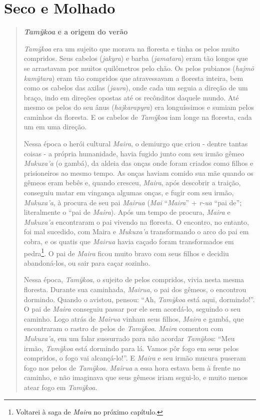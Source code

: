 \section{Seco e Molhado}\label{seco-e-molhado}

\begin{quote}
\textbf{\emph{Tamỹkoa} e a origem do verão}

\emph{Tamỹkoa} era um sujeito que morava na floresta e tinha os pelos
muito compridos. Seus cabelos (\emph{jakyra}) e barba (\emph{jamatara})
eram tão longos que se arrastavam por muitos quilômetros pelo chão. Os
pelos pubianos (\emph{hajmõ} \emph{kamỹtara}) eram tão compridos que
atravessavam a floresta inteira, bem como os cabelos das axilas
(\emph{jaura}), onde cada um seguia a direção de um braço, indo em
direções opostas até os recônditos daquele mundo. Até mesmo os pelos do
seu ânus (\emph{hajkarapyra}) era longuíssimos e sumiam pelos caminhos
da floresta. E os cabelos de \emph{Tamỹkoa} iam longe na floresta, cada
um em uma direção.

Nessa época o herói cultural \emph{Maira}, o demiurgo que criou - dentre
tantas coisas - a própria humanidade, havia fugido junto com seu irmão
gêmeo \emph{Mukuxa'a} (o gambá), da aldeia das onças onde foram criados
como filhos e prisioneiros ao mesmo tempo. As onças haviam comido sua
mãe quando os gêmeos eram bebês e, quando cresceu, \emph{Maira}, após
descobrir a traição, conseguiu matar em vingança algumas onças, e fugir
com seu irmão, \emph{Mukuxa'a}, à procura de seu pai \emph{Mairua}
(\emph{Mai} ``\emph{Maira}'' + \emph{r-ua} ``pai de''; literalmente o
``pai de \emph{Maira}). Após um tempo de procura, \emph{Maira} e
\emph{Mukuxa'a} encontraram o pai vivendo na floresta. O encontro, no
entanto, foi mal sucedido, com Maira e \emph{Mukuxa'a} transformando o
arco do pai em cobra, e os quatis que \emph{Mairua} havia caçado foram
transformados em pedra\footnote{Voltarei à saga de \emph{Maira} no
  próximo capítulo.}. O pai de \emph{Maira} ficou muito bravo com seus
filhos e decidiu abandoná-los, ou sair para caçar sozinho.

Nessa época, \emph{Tamỹkoa}, o sujeito de pelos compridos, vivia nesta
mesma floresta. Durante sua caminhada, \emph{Mairua}, o pai dos gêmeos,
o encontrou dormindo. Quando o avistou, pensou: ``Ah, \emph{Tamỹkoa}
está aqui, dormindo!''. O pai de \emph{Maira} conseguiu passar por ele
sem acordá-lo, seguindo o seu caminho. Logo atrás de \emph{Mairua}
vinham seus filhos, \emph{Maira} e gambá, que encontraram o rastro de
pelos de \emph{Tamỹkoa}. \emph{Maira} comentou com \emph{Mukuxa'a}, em
um falar sussurrado para não acordar \emph{Tamỹkoa}: ``Meu irmão,
\emph{Tamỹkoa} está dormindo para lá. Vamos pôr fogo em seus pelos
compridos, o fogo vai alcançá-lo!''. E \emph{Maira} e seu irmão mucura
puseram fogo nos pelos de \emph{Tamỹkoa}. \emph{Mairua} a essa hora
estava bem à frente no caminho, e não imaginava que seus gêmeos iriam
segui-lo, e muito menos atear fogo em \emph{Tamỹkoa}.


\end{quote}

